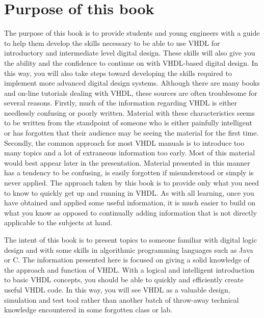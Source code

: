 %
%
%
{} %
\chapter*{Purpose of this book}
The purpose of this book is to provide students and young engineers with a guide to help them develop the skills necessary to be able to use VHDL for introductory and intermediate level digital design. These skills will also give you the ability and the confidence to continue on with VHDL-based digital design. In this way, you will also take steps toward developing the skills required to implement more advanced digital design systems.
Although there are many books and on-line tutorials dealing with VHDL, these sources are often troublesome for several reasons. Firstly, much of the information regarding VHDL is either needlessly confusing or poorly written. Material with these characteristics seems to be written from the standpoint of someone who is either painfully intelligent or has forgotten that their audience may be seeing the material for the first time. Secondly, the common approach for most VHDL manuals is to introduce too many topics and a lot of extraneous information too early. Most of this material would best appear later in the presentation. Material presented in this manner has a tendency to be confusing, is easily forgotten if misunderstood or simply is never applied. The approach taken by this book is to provide only what you need to know to quickly get up and running in VHDL. As with all learning, once you have obtained and applied some useful information, it is much easier to build on what you know as opposed to continually adding information that is not directly applicable to the subjects at hand.

The intent of this book is to present topics to someone familiar with digital logic design and with some skills in algorithmic programming languages such as Java or C. The information presented here is focused on giving a solid knowledge of the approach and function of VHDL. With a logical and intelligent introduction to basic VHDL concepts, you should be able to quickly and efficiently create useful VHDL code. In this way, you will see VHDL as a valuable design, simulation and test tool rather than another batch of throw-away technical knowledge encountered in some forgotten class or lab.

